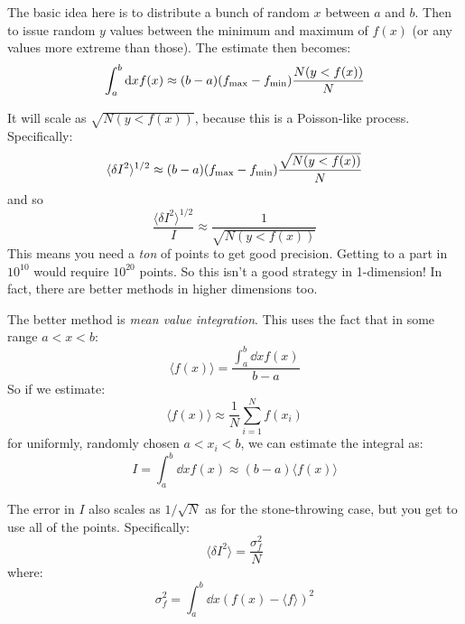 The basic idea here is to distribute a bunch of random $x$ between $a$
and $b$. Then to issue random $y$ values between the minimum and
maximum of $f(x)$ (or any values more extreme than those). The
estimate then becomes:
\begin{equation}
\int_a^b {\rm d}x f(x) \approx (b-a) (f_{\rm max} - f_{\rm min})
\frac{N(y<f(x))}{N}
\end{equation}


\begin{answer}
It will scale as $\sqrt{N(y<f(x))}$, because this is a Poisson-like
process.  Specifically:
\begin{equation}
\langle\delta I^2 \rangle^{1/2} \approx (b-a) (f_{\rm max} - f_{\rm min})
\frac{\sqrt{N(y<f(x))}}{N}
\end{equation}
and so
\begin{equation}
\frac{\langle\delta I^2 \rangle^{1/2}}{I} \approx 
\frac{1}{\sqrt{N(y<f(x))}}
\end{equation}
This means you need a {\it ton} of points to get good
precision. Getting to a part in $10^{10}$ would require $10^{20}$
points. So this isn't a good strategy in 1-dimension! In fact, there
are better methods in higher dimensions too.
\end{answer}

The better method is {\it mean value integration}. This uses the fact
that in some range $a<x<b$:
\begin{equation}
\langle f(x) \rangle = \frac{\int_a^b \dd{x}  f(x)}{b-a}
\end{equation}
So if we estimate:
\begin{equation}
\langle f(x) \rangle \approx \frac{1}{N}\sum_{i=1}^N f(x_i)
\end{equation}
for uniformly, randomly chosen $a<x_i<b$, we can estimate the integral
as:
\begin{equation}
I = \int_a^b \dd{x}  f(x) \approx (b-a) \langle f(x)\rangle
\end{equation}

The error in $I$ also scales as $1/\sqrt{N}$ as for the stone-throwing
case, but you get to use all of the points.  Specifically:
\begin{equation}
\langle \delta I^2 \rangle = \frac{\sigma_f^2}{N} 
\end{equation}
where:
\begin{equation}
\sigma_f^2 = \int_a^b \dd{x} (f(x) - \langle f\rangle)^2
\end{equation}

